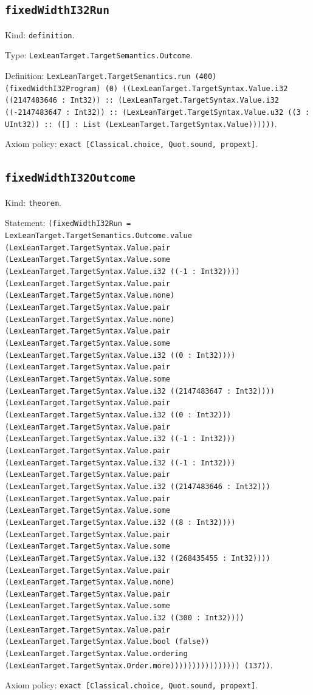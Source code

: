 \documentclass[11pt]{article}
\begin{document}
\subsection*{\texttt{fixedWidthI32Run}}
\noindent Kind: \texttt{definition}.\par
\noindent Type: \texttt{LexLeanTarget.TargetSemantics.Outcome}.\par
\noindent Definition: \texttt{LexLeanTarget.TargetSemantics.run (400) (fixedWidthI32Program) (0) ((LexLeanTarget.TargetSyntax.Value.i32 ((2147483646 : Int32)) :: (LexLeanTarget.TargetSyntax.Value.i32 ((-2147483647 : Int32)) :: (LexLeanTarget.TargetSyntax.Value.u32 ((3 : UInt32)) :: ([] : List (LexLeanTarget.TargetSyntax.Value))))))}.\par
\noindent Axiom policy: \texttt{exact [Classical.choice, Quot.sound, propext]}.\par
\subsection*{\texttt{fixedWidthI32Outcome}}
\noindent Kind: \texttt{theorem}.\par
\noindent Statement: \texttt{(fixedWidthI32Run = LexLeanTarget.TargetSemantics.Outcome.value (LexLeanTarget.TargetSyntax.Value.pair (LexLeanTarget.TargetSyntax.Value.some (LexLeanTarget.TargetSyntax.Value.i32 ((-1 : Int32)))) (LexLeanTarget.TargetSyntax.Value.pair (LexLeanTarget.TargetSyntax.Value.none) (LexLeanTarget.TargetSyntax.Value.pair (LexLeanTarget.TargetSyntax.Value.none) (LexLeanTarget.TargetSyntax.Value.pair (LexLeanTarget.TargetSyntax.Value.some (LexLeanTarget.TargetSyntax.Value.i32 ((0 : Int32)))) (LexLeanTarget.TargetSyntax.Value.pair (LexLeanTarget.TargetSyntax.Value.some (LexLeanTarget.TargetSyntax.Value.i32 ((2147483647 : Int32)))) (LexLeanTarget.TargetSyntax.Value.pair (LexLeanTarget.TargetSyntax.Value.i32 ((0 : Int32))) (LexLeanTarget.TargetSyntax.Value.pair (LexLeanTarget.TargetSyntax.Value.i32 ((-1 : Int32))) (LexLeanTarget.TargetSyntax.Value.pair (LexLeanTarget.TargetSyntax.Value.i32 ((-1 : Int32))) (LexLeanTarget.TargetSyntax.Value.pair (LexLeanTarget.TargetSyntax.Value.i32 ((2147483646 : Int32))) (LexLeanTarget.TargetSyntax.Value.pair (LexLeanTarget.TargetSyntax.Value.some (LexLeanTarget.TargetSyntax.Value.i32 ((8 : Int32)))) (LexLeanTarget.TargetSyntax.Value.pair (LexLeanTarget.TargetSyntax.Value.some (LexLeanTarget.TargetSyntax.Value.i32 ((268435455 : Int32)))) (LexLeanTarget.TargetSyntax.Value.pair (LexLeanTarget.TargetSyntax.Value.none) (LexLeanTarget.TargetSyntax.Value.pair (LexLeanTarget.TargetSyntax.Value.some (LexLeanTarget.TargetSyntax.Value.i32 ((300 : Int32)))) (LexLeanTarget.TargetSyntax.Value.pair (LexLeanTarget.TargetSyntax.Value.bool (false)) (LexLeanTarget.TargetSyntax.Value.ordering (LexLeanTarget.TargetSyntax.Order.more)))))))))))))))) (137))}.\par
\noindent Axiom policy: \texttt{exact [Classical.choice, Quot.sound, propext]}.\par
\end{document}
